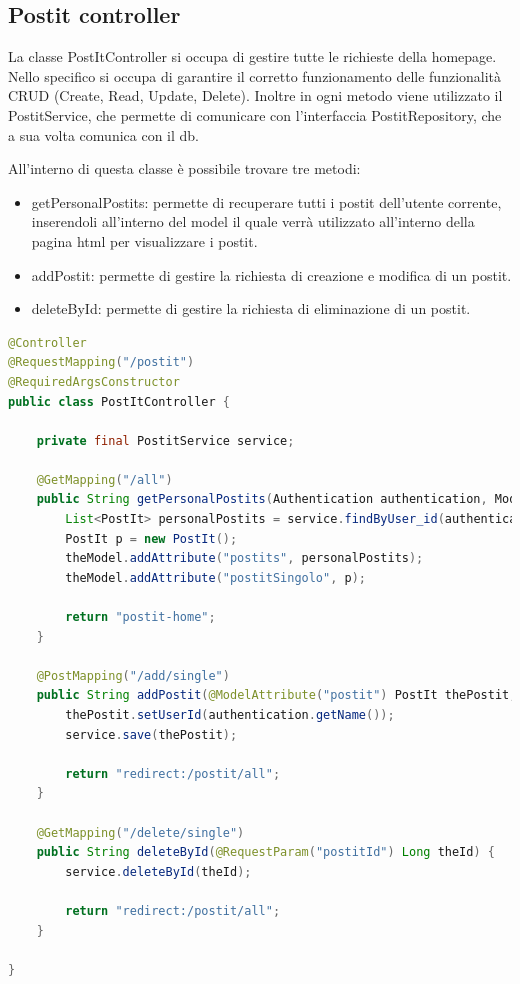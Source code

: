 \subsection{Postit controller}
La classe PostItController si occupa di gestire tutte le richieste della homepage. Nello specifico si occupa di garantire il corretto funzionamento delle funzionalità CRUD (Create, Read, Update, Delete).
Inoltre in ogni metodo viene utilizzato il PostitService, che permette di comunicare con l'interfaccia PostitRepository, che a sua volta comunica con il db.

All'interno di questa classe è possibile trovare tre metodi:
\begin{itemize}
    \item getPersonalPostits: permette di recuperare tutti i postit dell'utente corrente, inserendoli all'interno del model il quale verrà utilizzato all'interno della pagina html per visualizzare i postit.
    \item addPostit: permette di gestire la richiesta di creazione e modifica di un postit.
    \item deleteById: permette di gestire la richiesta di eliminazione di un postit.
\end{itemize}
\newpage
\begin{lstlisting}[language=Java,basicstyle=\small, caption={Postit Controller}, captionpos=b]
@Controller
@RequestMapping("/postit")
@RequiredArgsConstructor
public class PostItController {

    private final PostitService service;

    @GetMapping("/all")
    public String getPersonalPostits(Authentication authentication, Model theModel) {
        List<PostIt> personalPostits = service.findByUser_id(authentication.getName());
        PostIt p = new PostIt();
        theModel.addAttribute("postits", personalPostits);
        theModel.addAttribute("postitSingolo", p);

        return "postit-home";
    }

    @PostMapping("/add/single")
    public String addPostit(@ModelAttribute("postit") PostIt thePostit, Authentication authentication) {
        thePostit.setUserId(authentication.getName());
        service.save(thePostit);

        return "redirect:/postit/all";
    }

    @GetMapping("/delete/single")
    public String deleteById(@RequestParam("postitId") Long theId) {
        service.deleteById(theId);

        return "redirect:/postit/all";
    }

}
\end{lstlisting}
\newpage
